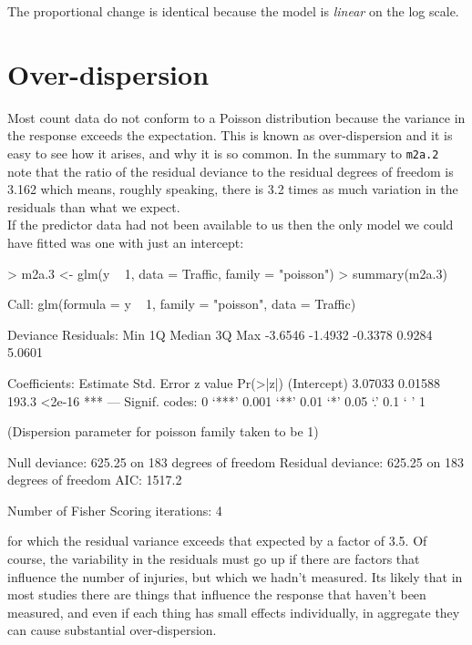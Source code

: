 \documentclass{article}
\begin{document}
The proportional change is identical because the model is \emph{linear} on the log scale.

\section{Over-dispersion}  

Most count data do not conform to a Poisson distribution because the variance in the response exceeds the expectation. This is known as over-dispersion and it is easy to see how it arises, and why it is so common. In the summary to \texttt{m2a.2} note that the ratio of the residual deviance  
to the residual degrees of freedom is 3.162 which means, roughly speaking, there is 3.2 times as much variation in the residuals than what we expect.\\

If the predictor data had not been available to us then the only model we could have fitted was one with just an intercept: 

\begin{Schunk}
\begin{Sinput}
> m2a.3 <- glm(y ~ 1, data = Traffic, family = "poisson")
> summary(m2a.3)
\end{Sinput}
\begin{Soutput}
Call:
glm(formula = y ~ 1, family = "poisson", data = Traffic)

Deviance Residuals: 
    Min       1Q   Median       3Q      Max  
-3.6546  -1.4932  -0.3378   0.9284   5.0601  

Coefficients:
            Estimate Std. Error z value Pr(>|z|)    
(Intercept)  3.07033    0.01588   193.3   <2e-16 ***
---
Signif. codes:  0 ‘***’ 0.001 ‘**’ 0.01 ‘*’ 0.05 ‘.’ 0.1 ‘ ’ 1 

(Dispersion parameter for poisson family taken to be 1)

    Null deviance: 625.25  on 183  degrees of freedom
Residual deviance: 625.25  on 183  degrees of freedom
AIC: 1517.2

Number of Fisher Scoring iterations: 4
\end{Soutput}
\end{Schunk}

for which the residual variance exceeds that expected by a factor of 3.5. Of course, the variability in the residuals must go up if there are factors that influence the number of injuries, but which we hadn't measured. Its likely that in most studies there are things that influence the response that haven't been measured, and even if each thing has small effects individually, in aggregate they can cause substantial over-dispersion.
\end{document}
